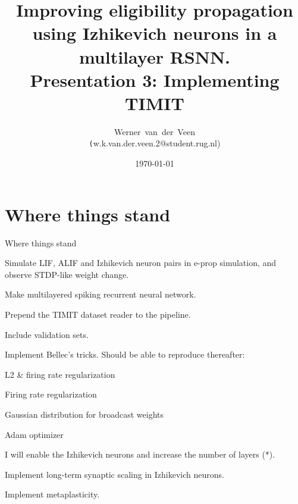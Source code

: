 \documentclass[t]{beamer}
\title[Eligibility propagation]{Improving eligibility propagation using Izhikevich neurons in a multilayer RSNN.\\\vspace{10pt}
\large{Presentation 3: Implementing TIMIT}}
\author[Werner]{Werner~van~der~Veen\\\tiny\texttt({w.k.van.der.veen.2@student.rug.nl})}\date{\today}
\newcommand{\cmark}{\ding{51}}%
\newcommand{\done}{\rlap{$\square$}{\raisebox{2pt}{\large\hspace{1pt}\cmark}}%
\hspace{-2.5pt}}
\begin{document}
\begin{frame}
    \titlepage
\end{frame}



\small
\section{Where things stand}
\begin{frame}{Where things stand}
	\begin{todolist}
    \item[\done] Simulate LIF, ALIF and Izhikevich neuron pairs in e-prop simulation, and observe STDP-like weight change.
    \item[\done] Make multilayered spiking recurrent neural network.
    \item[\done] Prepend the TIMIT dataset reader to the pipeline.
    \item Include validation sets.
    \item Implement Bellec's tricks. Should be able to reproduce thereafter:
    \begin{todolist}
    	\item L2 \& firing rate regularization
    	\item Firing rate regularization
    	\item Gaussian distribution for broadcast weights
    	\item Adam optimizer
    \end{todolist}
    \item I will enable the Izhikevich neurons and increase the number of layers (*).
    \item Implement long-term synaptic scaling in Izhikevich neurons.
    \item Implement metaplasticity.
  \end{todolist}
\end{frame}
\end{document}
